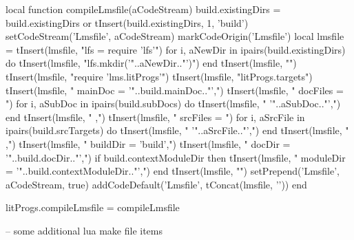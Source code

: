 \startLuaCode
local function compileLmsfile(aCodeStream)
  build.existingDirs = build.existingDirs or { }
  tInsert(build.existingDirs, 1, 'build')
  setCodeStream('Lmsfile', aCodeStream)
  markCodeOrigin('Lmsfile')
  local lmsfile = {}
  tInsert(lmsfile, "lfs = require 'lfs'\n")
  for i, aNewDir in ipairs(build.existingDirs) do
    tInsert(lmsfile, "lfs.mkdir('"..aNewDir.."')")
  end
  tInsert(lmsfile, "")
  tInsert(lmsfile, "require 'lms.litProgs'\n")
  tInsert(lmsfile, "litProgs.targets{")
  tInsert(lmsfile, "  mainDoc  = '"..build.mainDoc.."',")
  tInsert(lmsfile, "  docFiles = {")
  for i, aSubDoc in ipairs(build.subDocs) do
    tInsert(lmsfile, "    '"..aSubDoc.."',")
  end
  tInsert(lmsfile, "  },")
  tInsert(lmsfile, "  srcFiles = {")
  for i, aSrcFile in ipairs(build.srcTargets) do
    tInsert(lmsfile, "    '"..aSrcFile.."',")
  end
  tInsert(lmsfile, "  },")
  tInsert(lmsfile, "  buildDir  = 'build',")
  tInsert(lmsfile, "  docDir    = '"..build.docDir.."',")
  if build.contextModuleDir then
    tInsert(lmsfile, "  moduleDir = '"..build.contextModuleDir.."',")
  end
  tInsert(lmsfile, "}")
  setPrepend('Lmsfile', aCodeStream, true)
  addCodeDefault('Lmsfile', tConcat(lmsfile, '\n'))
end

litProgs.compileLmsfile = compileLmsfile
\stopLuaCode

\startLmsfile
-- some additional lua make file items
\stopLmsfile

\stopchapter